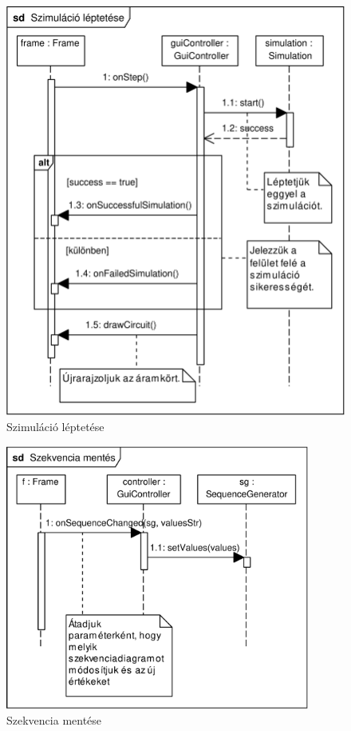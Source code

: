 \begin{figure}[H]
\begin{center}
\includegraphics[width=15cm]{chapters/chapter11/pdfs/7_step.pdf}
\caption{Szimuláció léptetése}
\label{fig:step}
\end{center}
\end{figure}

\begin{figure}[H]
\begin{center}
\includegraphics[width=10cm]{chapters/chapter11/pdfs/8_newsequence.pdf}
\caption{Szekvencia mentése}
\label{fig:newsequence}
\end{center}
\end{figure}

